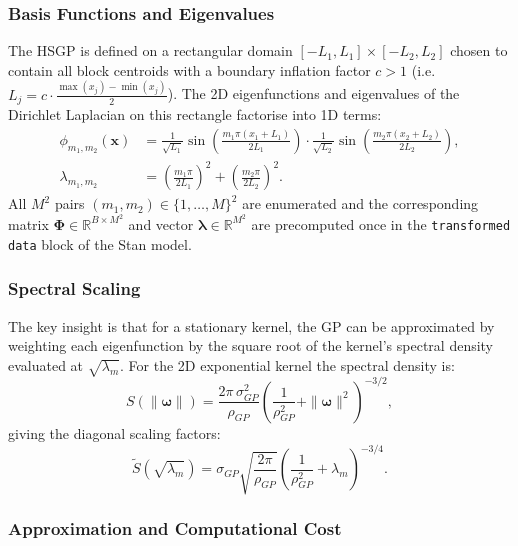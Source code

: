 \documentclass[12pt,a4paper]{article}
\begin{document}
\subsubsection{Basis Functions and Eigenvalues}

The HSGP is defined on a rectangular domain $[-L_1, L_1] \times [-L_2, L_2]$ chosen to contain all block centroids with a boundary inflation factor $c > 1$ (i.e.\ $L_j = c \cdot \frac{\max(x_j) - \min(x_j)}{2}$). The 2D eigenfunctions and eigenvalues of the Dirichlet Laplacian on this rectangle factorise into 1D terms:
\begin{align}
  \phi_{m_1,m_2}(\mathbf{x}) &= \frac{1}{\sqrt{L_1}}\sin\!\left(\frac{m_1\pi (x_1 + L_1)}{2L_1}\right) \cdot \frac{1}{\sqrt{L_2}}\sin\!\left(\frac{m_2\pi (x_2 + L_2)}{2L_2}\right), \\
  \lambda_{m_1,m_2} &= \left(\frac{m_1\pi}{2L_1}\right)^2 + \left(\frac{m_2\pi}{2L_2}\right)^2.
\end{align}
All $M^2$ pairs $(m_1, m_2) \in \{1,\ldots,M\}^2$ are enumerated and the corresponding matrix $\boldsymbol{\Phi} \in \mathbb{R}^{B \times M^2}$ and vector $\boldsymbol{\lambda} \in \mathbb{R}^{M^2}$ are precomputed once in the \texttt{transformed data} block of the Stan model.

\subsubsection{Spectral Scaling}

The key insight is that for a stationary kernel, the GP can be approximated by weighting each eigenfunction by the square root of the kernel's spectral density evaluated at $\sqrt{\lambda_m}$. For the 2D exponential kernel the spectral density is:
\begin{equation}
  S(\|\boldsymbol{\omega}\|) = \frac{2\pi\,\sigma_{GP}^2}{\rho_{GP}} \left(\frac{1}{\rho_{GP}^2} + \|\boldsymbol{\omega}\|^2\right)^{-3/2},
\end{equation}
giving the diagonal scaling factors:
\begin{equation}
  \widetilde{S}(\sqrt{\lambda_m}) = \sigma_{GP}\sqrt{\frac{2\pi}{\rho_{GP}}} \left(\frac{1}{\rho_{GP}^2} + \lambda_m\right)^{-3/4}.
\end{equation}

\subsubsection{Approximation and Computational Cost}
\end{document}
